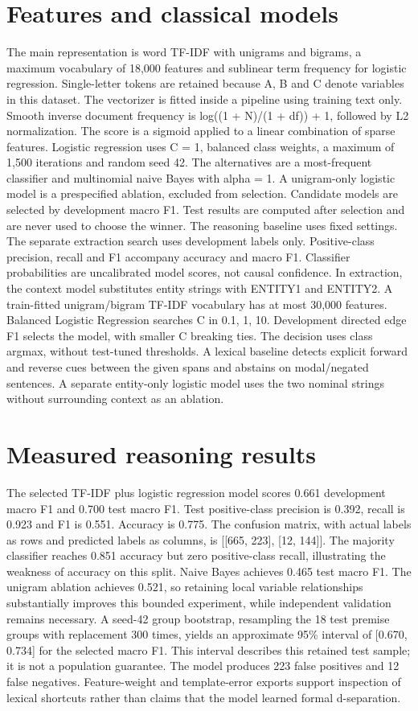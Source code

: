 \documentclass[conference]{IEEEtran}
\begin{document}
\section{Features and classical models}
The main representation is word TF-IDF with unigrams and bigrams, a maximum vocabulary of 18,000 features and sublinear term frequency for logistic regression. Single-letter tokens are retained because A, B and C denote variables in this dataset. The vectorizer is fitted inside a pipeline using training text only. Smooth inverse document frequency is log((1 + N)/(1 + df)) + 1, followed by L2 normalization. The score is a sigmoid applied to a linear combination of sparse features. Logistic regression uses C = 1, balanced class weights, a maximum of 1,500 iterations and random seed 42. The alternatives are a most-frequent classifier and multinomial naive Bayes with alpha = 1. A unigram-only logistic model is a prespecified ablation, excluded from selection. Candidate models are selected by development macro F1. Test results are computed after selection and are never used to choose the winner. The reasoning baseline uses fixed settings. The separate extraction search uses development labels only. Positive-class precision, recall and F1 accompany accuracy and macro F1. Classifier probabilities are uncalibrated model scores, not causal confidence. In extraction, the context model substitutes entity strings with ENTITY1 and ENTITY2. A train-fitted unigram/bigram TF-IDF vocabulary has at most 30,000 features. Balanced Logistic Regression searches C in {0.1, 1, 10}. Development directed edge F1 selects the model, with smaller C breaking ties. The decision uses class argmax, without test-tuned thresholds. A lexical baseline detects explicit forward and reverse cues between the given spans and abstains on modal/negated sentences. A separate entity-only logistic model uses the two nominal strings without surrounding context as an ablation.
\section{Measured reasoning results}
The selected TF-IDF plus logistic regression model scores 0.661 development macro F1 and 0.700 test macro F1. Test positive-class precision is 0.392, recall is 0.923 and F1 is 0.551. Accuracy is 0.775. The confusion matrix, with actual labels as rows and predicted labels as columns, is [[665, 223], [12, 144]]. The majority classifier reaches 0.851 accuracy but zero positive-class recall, illustrating the weakness of accuracy on this split. Naive Bayes achieves 0.465 test macro F1. The unigram ablation achieves 0.521, so retaining local variable relationships substantially improves this bounded experiment, while independent validation remains necessary. A seed-42 group bootstrap, resampling the 18 test premise groups with replacement 300 times, yields an approximate 95\% interval of [0.670, 0.734] for the selected macro F1. This interval describes this retained test sample; it is not a population guarantee. The model produces 223 false positives and 12 false negatives. Feature-weight and template-error exports support inspection of lexical shortcuts rather than claims that the model learned formal d-separation.
\end{document}
